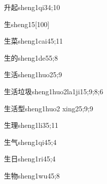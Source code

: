 \begin{verbete}{升起}{sheng1qi3}{4;10}
\end{verbete}

\begin{verbete}{生}{sheng1}{5}[100]
\end{verbete}

\begin{verbete}{生菜}{sheng1cai4}{5;11}
\end{verbete}

\begin{verbete}{生的}{sheng1de5}{5;8}
\end{verbete}

\begin{verbete}{生活}{sheng1huo2}{5;9}
\end{verbete}

\begin{verbete}{生活垃圾}{sheng1huo2la1ji1}{5;9;8;6}
\end{verbete}

\begin{verbete}{生活型}{sheng1huo2 xing2}{5;9;9}
\end{verbete}

\begin{verbete}{生理}{sheng1li3}{5;11}
\end{verbete}

\begin{verbete}{生气}{sheng1qi4}{5;4}
\end{verbete}

\begin{verbete}{生日}{sheng1ri4}{5;4}
\end{verbete}

\begin{verbete}{生物}{sheng1wu4}{5;8}
\end{verbete}

